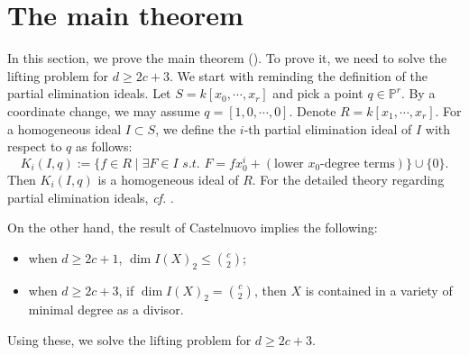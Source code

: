 \documentclass[11pt,letterpaper,reqno]{amsart}
\theoremstyle{plain}
\theoremstyle{definition}
\newtheorem{open problem}[theorem]{Open Problem}
\newtheorem{remark and notation}[theorem]{Remark and Notation}
\newtheorem{remark and definition}[theorem]{Remark and Definition}
\newtheorem{definition and notation}[theorem]{Definition and Notation}
\newtheorem{notation and convention}[theorem]{Notation and Convention}
\newtheorem{notation and remark}[theorem]{Notation and Remark}
\newtheorem{convention and notation}[theorem]{Convention and Notation}
\def \p {\mathbb{P}}
\begin{document}
\bigskip

\section{The main theorem}\label{sec:mainthm}
In this section, we prove the main theorem ().
To prove it, we need to solve the lifting problem for $d\geq 2c+3$.
We start with reminding the definition of the partial elimination ideals.
Let $S=k[x_0,\cdots,x_r]$ and pick a point $q\in \p^r$.
By a coordinate change, we may assume $q=[1,0,\cdots,0]$.
Denote $R=k[x_1,\cdots,x_r]$.
For a homogeneous ideal $I\subset S$, we define the $i$-th partial elimination ideal of $I$ with respect to $q$ as follows:
\[
    K_i(I,q):=\{f\in R\mid \exists F\in I \textit{ s.t. }F=fx_0^i+(\text{lower $x_0$-degree terms})\}\cup \{0\}.
\]
Then $K_i(I,q)$ is a homogeneous ideal of $R$. For the detailed theory regarding partial elimination ideals, \textit{cf.} \cite{MR1648665}.

On the other hand, the result of Castelnuovo \cite{castelnuovo1889ricerche} implies the following:
\begin{itemize}
    \item when $d\geq 2c+1$, $\dim I(X)_2\leq \binom{c}{2}$;
    \item when $d\geq 2c+3$, if $\dim I(X)_2=\binom{c}{2}$, then $X$ is contained in a variety of minimal degree as a divisor.
\end{itemize}

Using these, we solve the lifting problem for $d\geq 2c+3$.
\end{document}
